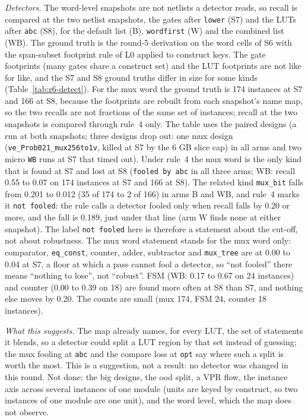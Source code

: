 \documentclass[conference]{IEEEtran}
\newcommand{\code}[1]{\texttt{#1}}
\begin{document}
\emph{Detectors.} The word-level snapshots are not netlists a detector reads, so recall is
compared at the two netlist snapshots, the gates after \code{lower} (S7) and the LUTs after
\code{abc} (S8), for the default list (B), \code{wordfirst} (W) and the combined list (WB). The
ground truth is the round-5 derivation on the word cells of S6 with the span-subset footprint rule
of L0 applied to construct keys. The gate footprints (many gates share a construct set) and the
LUT footprints are not like for like, and the S7 and S8 ground truths differ in size for some kinds
(Table~\ref{tab:r6-detect}). For the mux word the ground truth is 174 instances at S7 and 166 at S8, because
the footprints are rebuilt from each snapshot's name map, so the two recalls are not fractions of the same set
of instances; recall at the two snapshots is compared through rule~4 only. The table
uses the paired designs (a run at both snapshots; three designs drop out: one mux design
(\code{ve\_Prob021\_mux256to1v}, killed at S7 by the 6 GB slice cap) in all arms and two micro
\code{WB} runs at S7 that timed out). Under rule~4 the mux word is the only kind that is found at S7
and lost at S8 (\code{fooled by abc} in all three arms; WB: recall 0.55 to 0.07 on 174 instances at S7 and 166 at S8).
The related kind \code{mux\_bit} falls from 0.201 to 0.012 (35 of 174 to 2 of 166) in arms B and WB, and rule~4
marks it \code{not fooled}: the rule calls a detector fooled only when recall falls by 0.20 or more, and the fall
is 0.189, just under that line (arm W finds none at either snapshot). The label \code{not fooled} here is
therefore a statement about the cut-off, not about robustness. The mux word statement stands for the mux word only: comparator, \code{eq\_const}, counter, adder, subtractor
and \code{mux\_tree} are at 0.00 to 0.04 at S7, a floor at which a pass cannot fool a detector, so
``not fooled'' there means ``nothing to lose'', not ``robust''. FSM (WB: 0.17 to 0.67 on 24
instances) and counter (0.00 to 0.39 on 18) are found more often at S8 than S7, and nothing else
moves by 0.20. The counts are small (mux 174, FSM 24, counter 18 instances).

\emph{What this suggests.} The map already names, for every LUT, the set of statements it
blends, so a detector could split a LUT region by that set instead of guessing; the mux fooling at
\code{abc} and the compare loss at \code{opt} say where such a split is worth the most. This is a
suggestion, not a result: no detector was changed in this round. Not done: the big designs, the
ood split, a VPR flow, the instance axis across several instances of one module (units are keyed
by construct, so two instances of one module are one unit), and the word level, which the map does
not observe.
\end{document}
